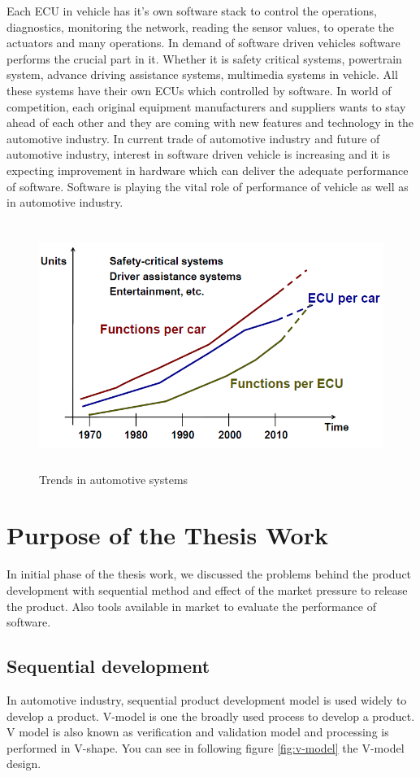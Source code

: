 \par Each ECU in vehicle has it's own software stack to control the operations, diagnostics, monitoring the network, reading the sensor values, to operate the actuators and many operations. In demand of software driven vehicles software performs the crucial part in it. Whether it is safety critical systems, powertrain system, advance driving assistance systems, multimedia systems in vehicle. All these systems have their own ECUs which controlled by software. In world of competition, each original equipment manufacturers and suppliers wants to stay ahead of each other and they are coming with new features and technology in the automotive industry. In current trade of automotive industry and future of automotive industry, interest in software driven vehicle is increasing and it is expecting improvement in hardware which can deliver the adequate performance of software. Software is playing the vital role of performance of vehicle as well as in automotive industry.

\begin{figure}[h!]
\includegraphics[width=12cm, height=8cm]{./images/ecu_per_year}
\centering
\caption{Trends in automotive systems}
\label{fig:num_ecu}
\end{figure}


\section{Purpose of the Thesis Work}
In initial phase of the thesis work, we discussed the problems behind the product development with sequential method and effect of the market pressure to release the product. Also tools available in market to evaluate the performance of software.

\subsection{Sequential development}
In automotive industry, sequential product development model is used widely to develop a product. V-model is one the broadly used process to develop a product. V model is also known as verification and validation model and processing is performed in V-shape. You can see in following figure \ref{fig:v-model} the V-model design.

